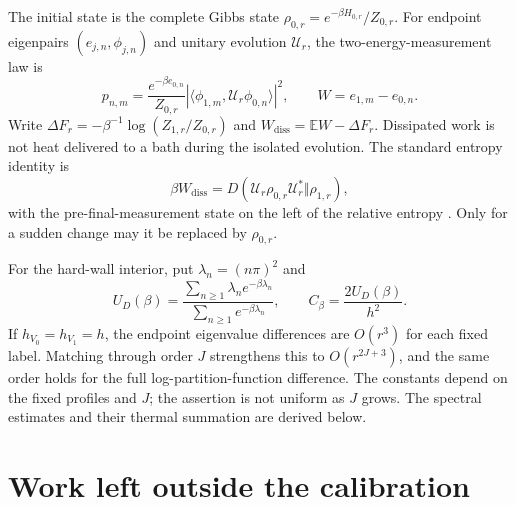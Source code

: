 \documentclass[aps,pra,reprint,superscriptaddress,longbibliography]{revtex4-2}
\newcommand{\Wd}{W_{\mathrm{diss}}}
\newcommand{\E}{\mathbb E}
\begin{document}
The initial state is the complete Gibbs state $\rho_{0,r}=e^{-\beta H_{0,r}}/Z_{0,r}$. For endpoint eigenpairs $(e_{j,n},\phi_{j,n})$ and unitary evolution $\mathcal U_r$, the two-energy-measurement law is
\begin{equation}
 p_{n,m}=\frac{e^{-\beta e_{0,n}}}{Z_{0,r}}
       |\langle\phi_{1,m},\mathcal U_r\phi_{0,n}\rangle|^2,
 \qquad W=e_{1,m}-e_{0,n}.\label{eq:tpm}
\end{equation}
Write $\Delta F_r=-\beta^{-1}\log(Z_{1,r}/Z_{0,r})$ and $\Wd=\E W-\Delta F_r$. Dissipated work is not heat delivered to a bath during the isolated evolution. The standard entropy identity is
\begin{equation}
 \beta\Wd=D(\mathcal U_r\rho_{0,r}\mathcal U_r^*\Vert\rho_{1,r}),
 \label{eq:entropy}
\end{equation}
with the pre-final-measurement state on the left of the relative entropy \cite{Deffner}. Only for a sudden change may it be replaced by $\rho_{0,r}$.

For the hard-wall interior, put $\lambda_n=(n\pi)^2$ and
\begin{equation}
 U_D(\beta)=\frac{\sum_{n\ge1}\lambda_ne^{-\beta\lambda_n}}
                         {\sum_{n\ge1}e^{-\beta\lambda_n}},
 \qquad C_\beta=\frac{2U_D(\beta)}{h^2}.\label{eq:pressure1d}
\end{equation}
If $h_{V_0}=h_{V_1}=h$, the endpoint eigenvalue differences are $O(r^3)$ for each fixed label. Matching through order $J$ strengthens this to $O(r^{2J+3})$, and the same order holds for the full log-partition-function difference. The constants depend on the fixed profiles and $J$; the assertion is not uniform as $J$ grows. The spectral estimates and their thermal summation are derived below.

\section{Work left outside the calibration}
\end{document}
